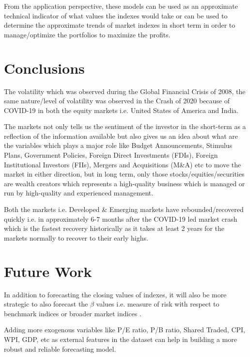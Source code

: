 \documentclass[conference]{IEEEtran}
\begin{document}
From the application perspective, these models can be used as an approximate technical indicator of what values the indexes would take or can be used to determine the approximate trends of market indexes in short term in order to manage/optimize the portfolios to maximize the profits.

\section{Conclusions}
The volatility which was observed during the Global Financial Crisis of 2008, the same nature/level of volatility was observed in the Crash of 2020 because of COVID-19 in both the equity markets i.e. United States of America and India. \newline

The markets not only tells us the sentiment of the investor in the short-term as a reflection of the information available but also gives us an idea about what are the variables which plays a major role like Budget Announcements, Stimulus Plans, Government Policies, Foreign Direct Investments (FDIs), Foreign Institutional Investors (FIIs), Mergers and Acquisitions (M\&A) etc to move the market in either direction, but in long term, only those stocks/equities/securities are wealth creators which represents a high-quality business which is managed or run by high-quality and experienced management.

Both the markets i.e. Developed \& Emerging markets have rebounded/recovered quickly i.e. in approximately 6-7 months after the COVID-19 led market crash which is the fastest recovery historically as it takes at least 2 years for the markets normally to recover to their early highs.

\section{Future Work}
In addition to forecasting the closing values of indexes, it will also be more strategic to also forecast the $\beta$ values i.e. measure of risk with respect to benchmark indices or broader market indices \cite{b3}.

Adding more exogenous variables like P/E ratio, P/B ratio, Shared Traded, CPI, WPI, GDP, etc as external features in the dataset can help in building a more robust and reliable forecasting model.
\end{document}
